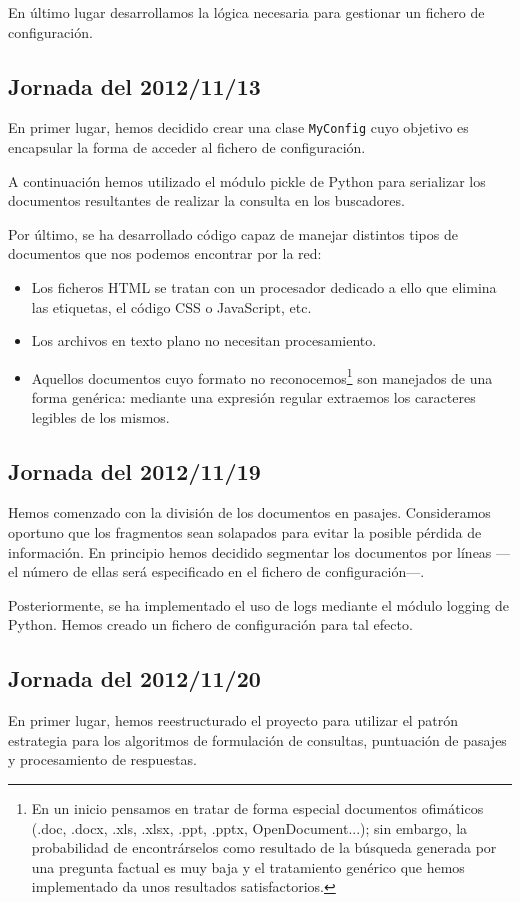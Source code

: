 \documentclass[12pt,a4paper,titlepage]{article}
\begin{document}
En último lugar desarrollamos la lógica necesaria para gestionar un fichero de configuración.

\subsection{Jornada del 2012/11/13}
En primer lugar, hemos decidido crear una clase \texttt{MyConfig} cuyo objetivo es encapsular la forma de acceder al fichero de configuración.

A continuación hemos utilizado el módulo pickle de Python para serializar los documentos resultantes de realizar la consulta en los buscadores.

Por último, se ha desarrollado código capaz de manejar distintos tipos de documentos que nos podemos encontrar por la red:
\begin{itemize}
\item Los ficheros HTML se tratan con un procesador dedicado a ello que elimina las etiquetas, el código CSS o JavaScript, etc.
\item Los archivos en texto plano no necesitan procesamiento.
\item Aquellos documentos cuyo formato no reconocemos\footnote{En un inicio pensamos en tratar de forma especial documentos ofimáticos (.doc, .docx, .xls, .xlsx, .ppt, .pptx, OpenDocument...); sin embargo, la probabilidad de encontrárselos como resultado de la búsqueda generada por una pregunta factual es muy baja y el tratamiento genérico que hemos implementado da unos resultados satisfactorios.} son manejados de una forma genérica: mediante una expresión regular extraemos los caracteres legibles de los mismos.
\end{itemize}

\subsection{Jornada del 2012/11/19}
Hemos comenzado con la división de los documentos en pasajes. Consideramos oportuno que los fragmentos sean solapados para evitar la posible pérdida de información. En principio hemos decidido segmentar los documentos por líneas ---el número de ellas será especificado en el fichero de configuración---.

Posteriormente, se ha implementado el uso de logs mediante el módulo logging de Python. Hemos creado un fichero de configuración para tal efecto.

\subsection{Jornada del 2012/11/20}
En primer lugar, hemos reestructurado el proyecto para utilizar el patrón estrategia para los algoritmos de formulación de consultas, puntuación de pasajes y procesamiento de respuestas.
\end{document}

